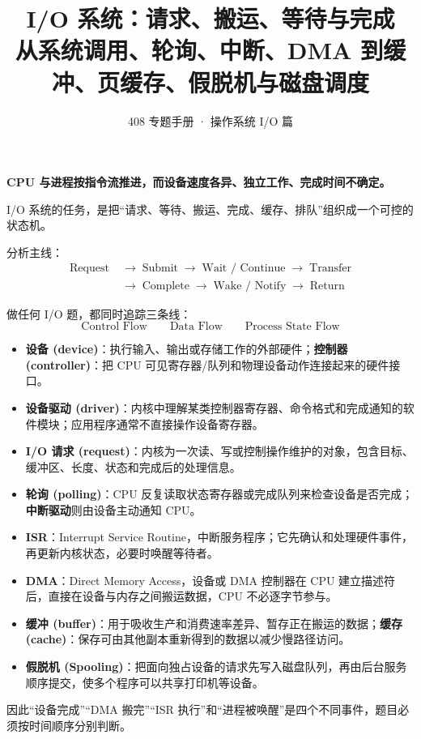 \documentclass[UTF8,fontset=fandol,11pt,a4paper]{ctexart}
\title{\vspace{-1.2cm}\textbf{I/O 系统：请求、搬运、等待与完成}\\[0.35em]
\large 从系统调用、轮询、中断、DMA 到缓冲、页缓存、假脱机与磁盘调度}
\author{408 专题手册 · 操作系统 I/O 篇}
\date{}
\newcommand{\kw}[1]{\textbf{#1}}
\newcommand{\arr}{\;\longrightarrow\;}
\begin{document}
\maketitle

\begin{corebox}
\begin{center}
\Large\bfseries CPU 与进程按指令流推进，而设备速度各异、独立工作、完成时间不确定。\par
I/O 系统的任务，是把“请求、等待、搬运、完成、缓存、排队”组织成一个可控的状态机。
\end{center}

分析主线：
\[
\boxed{
\begin{aligned}
\text{Request}&\arr\text{Submit}\arr\text{Wait / Continue}\arr\text{Transfer}\\
&\arr\text{Complete}\arr\text{Wake / Notify}\arr\text{Return}
\end{aligned}}
\]

做任何 I/O 题，都同时追踪三条线：
\[
\boxed{\text{Control Flow}}
\qquad
\boxed{\text{Data Flow}}
\qquad
\boxed{\text{Process State Flow}}
\]
\end{corebox}

\begin{method}
\begin{itemize}[leftmargin=1.5em]
  \item \kw{设备 (device)}：执行输入、输出或存储工作的外部硬件；\kw{控制器 (controller)}：把 CPU 可见寄存器/队列和物理设备动作连接起来的硬件接口。
  \item \kw{设备驱动 (driver)}：内核中理解某类控制器寄存器、命令格式和完成通知的软件模块；应用程序通常不直接操作设备寄存器。
  \item \kw{I/O 请求 (request)}：内核为一次读、写或控制操作维护的对象，包含目标、缓冲区、长度、状态和完成后的处理信息。
  \item \kw{轮询 (polling)}：CPU 反复读取状态寄存器或完成队列来检查设备是否完成；\kw{中断驱动}则由设备主动通知 CPU。
  \item \kw{ISR}：Interrupt Service Routine，中断服务程序；它先确认和处理硬件事件，再更新内核状态，必要时唤醒等待者。
  \item \kw{DMA}：Direct Memory Access，设备或 DMA 控制器在 CPU 建立描述符后，直接在设备与内存之间搬运数据，CPU 不必逐字节参与。
  \item \kw{缓冲 (buffer)}：用于吸收生产和消费速率差异、暂存正在搬运的数据；\kw{缓存 (cache)}：保存可由其他副本重新得到的数据以减少慢路径访问。
  \item \kw{假脱机 (Spooling)}：把面向独占设备的请求先写入磁盘队列，再由后台服务顺序提交，使多个程序可以共享打印机等设备。
\end{itemize}
因此“设备完成”“DMA 搬完”“ISR 执行”和“进程被唤醒”是四个不同事件，题目必须按时间顺序分别判断。
\end{method}
\end{document}

